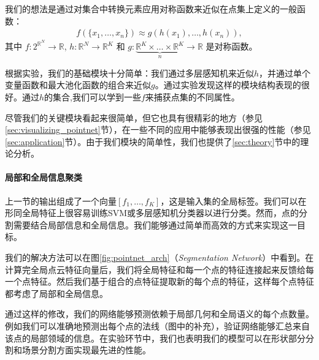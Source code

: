 我们的想法是通过对集合中转换元素应用对称函数来近似在点集上定义的一般函数：
\begin{align}
    f(\{x_1, \dots, x_n\})\approx g(h(x_1), \dots, h(x_n)),
    \label{eq:approx}
\end{align}
其中 $f:2^{\mathbb{R}^N} \rightarrow \mathbb{R}$, $h: \mathbb{R}^N\rightarrow \mathbb{R}^K$ 和 $g:\underbrace{\mathbb{R}^K\times \dots \times \mathbb{R}^K}_n \rightarrow \mathbb{R}$ 是对称函数。

根据实验，我们的基础模块十分简单：我们通过多层感知机来近似$h$，并通过单个变量函数和最大池化函数的组合来近似$g$。通过实验发现这样的模块结构表现的很好。通过$h$的集合,我们可以学到一些$f$来捕获点集的不同属性。 %

尽管我们的关键模块看起来很简单，但它也具有很精彩的地方（参见\ref{sec:visualizing_pointnet}节），在一些不同的应用中能够表现出很强的性能（参见\ref{sec:application}节）。由于我们模块的简单性，我们也提供了\ref{sec:theory}节中的理论分析。


\paragraph{局部和全局信息聚类}
上一节的输出组成了一个向量$[f_1, \dots, f_K]$，这是输入集的全局标签。我们可以在形同全局特征上很容易训练SVM或多层感知机分类器以进行分类。然而，点的分割需要结合局部信息和全局信息。我们能够通过简单而高效的方式来实现这一目标。 %

我们的解决方法可以在图\ref{fig:pointnet_arch}（\textit{Segmentation Network}）中看到。在计算完全局点云特征向量后，我们将全局特征和每一个点的特征连接起来反馈给每一个点特征。然后我们基于组合的点特征提取新的每个点的特征，这样每个点特征都考虑了局部和全局信息。 %

通过这样的修改，我们的网络能够预测依赖于局部几何和全局语义的每个点数量。例如我们可以准确地预测出每个点的法线（图中的补充），验证网络能够汇总来自该点的局部领域的信息。在实验环节中，我们也表明我们的模型可以在形状部分分割和场景分割方面实现最先进的性能。
    
